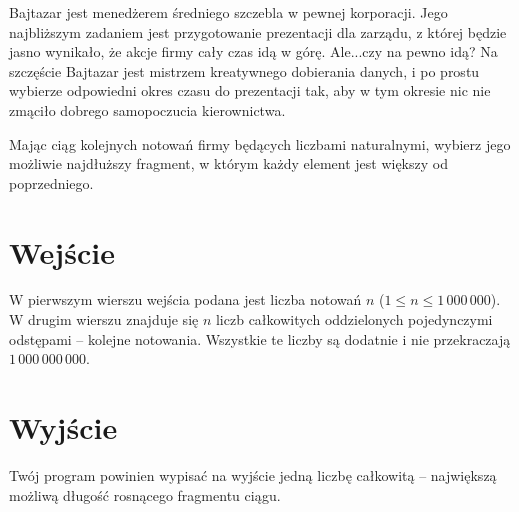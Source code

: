 \documentclass{spiral-kurs}
\begin{document}
  \makeheader
  
      Bajtazar jest menedżerem średniego szczebla w pewnej korporacji. Jego najbliższym zadaniem jest przygotowanie prezentacji dla zarządu, z której będzie jasno wynikało, że akcje firmy cały czas idą w górę. Ale...czy na pewno idą? Na szczęście Bajtazar jest mistrzem kreatywnego dobierania danych, i po prostu wybierze odpowiedni okres czasu do prezentacji tak, aby w tym okresie nic nie zmąciło dobrego samopoczucia kierownictwa.
      
      Mając ciąg kolejnych notowań firmy będących liczbami naturalnymi, wybierz jego możliwie najdłuższy fragment, w którym każdy element jest większy od poprzedniego.
      
      
  \section{Wejście}
      W pierwszym wierszu wejścia podana jest liczba notowań $n$ ($1 \leq n \leq 1\,000\,000$). W drugim wierszu znajduje się $n$ liczb całkowitych oddzielonych pojedynczymi odstępami -- kolejne notowania. Wszystkie te liczby są dodatnie i nie przekraczają $1\,000\,000\,000$.
      
      
  \section{Wyjście}
      Twój program powinien wypisać na wyjście jedną liczbę całkowitą -- największą możliwą długość rosnącego fragmentu ciągu.

  
\end{document}
